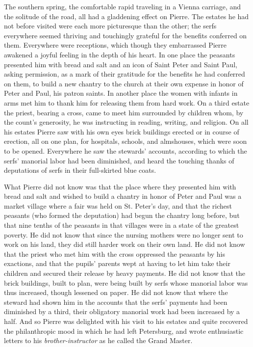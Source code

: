 The southern spring, the comfortable rapid traveling in a Vienna
carriage, and the solitude of the road, all had a gladdening
effect on Pierre. The estates he had not before visited were each
more picturesque than the other; the serfs everywhere seemed
thriving and touchingly grateful for the benefits conferred on
them. Everywhere were receptions, which though they embarrassed
Pierre awakened a joyful feeling in the depth of his heart. In
one place the peasants presented him with bread and salt and an
icon of Saint Peter and Saint Paul, asking permission, as a mark
of their gratitude for the benefits he had conferred on them, to
build a new chantry to the church at their own expense in honor
of Peter and Paul, his patron saints. In another place the women
with infants in arms met him to thank him for releasing them from
hard work.  On a third estate the priest, bearing a cross, came
to meet him surrounded by children whom, by the count's
generosity, he was instructing in reading, writing, and
religion. On all his estates Pierre saw with his own eyes brick
buildings erected or in course of erection, all on one plan, for
hospitals, schools, and almshouses, which were soon to be
opened. Everywhere he saw the stewards' accounts, according to
which the serfs' manorial labor had been diminished, and heard
the touching thanks of deputations of serfs in their full-skirted
blue coats.

What Pierre did not know was that the place where they presented
him with bread and salt and wished to build a chantry in honor of
Peter and Paul was a market village where a fair was held on
St. Peter's day, and that the richest peasants (who formed the
deputation) had begun the chantry long before, but that nine
tenths of the peasants in that villages were in a state of the
greatest poverty. He did not know that since the nursing mothers
were no longer sent to work on his land, they did still harder
work on their own land. He did not know that the priest who met
him with the cross oppressed the peasants by his exactions, and
that the pupils' parents wept at having to let him take their
children and secured their release by heavy payments. He did not
know that the brick buildings, built to plan, were being built by
serfs whose manorial labor was thus increased, though lessened on
paper. He did not know that where the steward had shown him in
the accounts that the serfs' payments had been diminished by a
third, their obligatory manorial work had been increased by a
half. And so Pierre was delighted with his visit to his estates
and quite recovered the philanthropic mood in which he had left
Petersburg, and wrote enthusiastic letters to his
\emph{brother-instructor} as he called the Grand Master.

